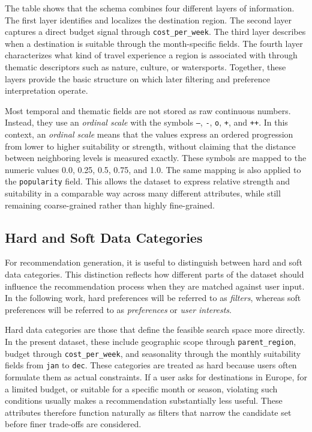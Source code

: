 The table shows that the schema combines four different layers of information. The first layer identifies and localizes the destination region. The second layer captures a direct budget signal through \texttt{cost\_per\_week}. The third layer describes when a destination is suitable through the month-specific fields. The fourth layer characterizes what kind of travel experience a region is associated with through thematic descriptors such as nature, culture, or watersports. Together, these layers provide the basic structure on which later filtering and preference interpretation operate.

Most temporal and thematic fields are not stored as raw continuous numbers. Instead, they use an \emph{ordinal scale} with the symbols \texttt{--}, \texttt{-}, \texttt{o}, \texttt{+}, and \texttt{++}. In this context, an \emph{ordinal scale} means that the values express an ordered progression from lower to higher suitability or strength, without claiming that the distance between neighboring levels is measured exactly. These symbols are mapped to the numeric values 0.0, 0.25, 0.5, 0.75, and 1.0. The same mapping is also applied to the \texttt{popularity} field. This allows the dataset to express relative strength and suitability in a comparable way across many different attributes, while still remaining coarse-grained rather than highly fine-grained.

\subsection{Hard and Soft Data Categories}\label{subsection:recommendation-generation:data-grounding:hard-soft-preferences}

For recommendation generation, it is useful to distinguish between hard and soft data categories. This distinction reflects how different parts of the dataset should influence the recommendation process when they are matched against user input. In the following work, hard preferences will be referred to as \emph{filters}, whereas soft preferences will be referred to as \emph{preferences} or \emph{user interests}.

Hard data categories are those that define the feasible search space more directly. In the present dataset, these include geographic scope through \texttt{parent\_region}, budget through \texttt{cost\_per\_week}, and seasonality through the monthly suitability fields from \texttt{jan} to \texttt{dec}. These categories are treated as hard because users often formulate them as actual constraints. If a user asks for destinations in Europe, for a limited budget, or suitable for a specific month or season, violating such conditions usually makes a recommendation substantially less useful. These attributes therefore function naturally as filters that narrow the candidate set before finer trade-offs are considered.

